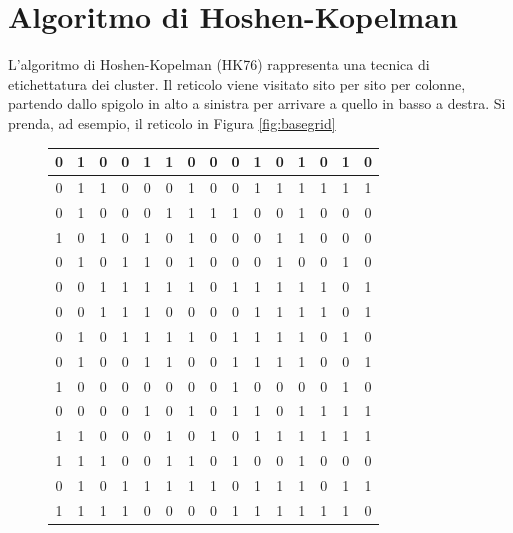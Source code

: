 \section{Algoritmo di Hoshen-Kopelman}
L’algoritmo di Hoshen-Kopelman (HK76) rappresenta una tecnica di etichettatura dei cluster. Il reticolo viene visitato sito per sito per colonne, partendo dallo spigolo in alto a sinistra per arrivare a quello in basso a destra. Si prenda, ad esempio, il reticolo in Figura \ref{fig:basegrid}
\begin{figure}[H]
	\centering
	\scriptsize %
	\setlength{\tabcolsep}{5.4pt} %
	\renewcommand{\arraystretch}{1.2} %
	\begin{minipage}{0.4\textwidth}
		\centering
		\begin{tabular}{|*{15}{c|}}
			\hline
			0 & 1 & 0 & 0 & 1 & 1 & 0 & 0 & 0 & 1 & 0 & 1 & 0 & 1 & 0 \\
			\hline
			0 & 1 & 1 & 0 & 0 & 0 & 1 & 0 & 0 & 1 & 1 & 1 & 1 & 1 & 1 \\
			\hline
			0 & 1 & 0 & 0 & 0 & 1 & 1 & 1 & 1 & 0 & 0 & 1 & 0 & 0 & 0 \\
			\hline
			1 & 0 & 1 & 0 & 1 & 0 & 1 & 0 & 0 & 0 & 1 & 1 & 0 & 0 & 0 \\
			\hline
			0 & 1 & 0 & 1 & 1 & 0 & 1 & 0 & 0 & 0 & 1 & 0 & 0 & 1 & 0 \\
			\hline
			0 & 0 & 1 & 1 & 1 & 1 & 1 & 0 & 1 & 1 & 1 & 1 & 1 & 0 & 1 \\
			\hline
			0 & 0 & 1 & 1 & 1 & 0 & 0 & 0 & 0 & 1 & 1 & 1 & 1 & 0 & 1 \\
			\hline
			0 & 1 & 0 & 1 & 1 & 1 & 1 & 0 & 1 & 1 & 1 & 1 & 0 & 1 & 0 \\
			\hline
			0 & 1 & 0 & 0 & 1 & 1 & 0 & 0 & 1 & 1 & 1 & 1 & 0 & 0 & 1 \\
			\hline
			1 & 0 & 0 & 0 & 0 & 0 & 0 & 0 & 1 & 0 & 0 & 0 & 0 & 1 & 0 \\
			\hline
			0 & 0 & 0 & 0 & 1 & 0 & 1 & 0 & 1 & 1 & 0 & 1 & 1 & 1 & 1 \\
			\hline
			1 & 1 & 0 & 0 & 0 & 1 & 0 & 1 & 0 & 1 & 1 & 1 & 1 & 1 & 1 \\
			\hline
			1 & 1 & 1 & 0 & 0 & 1 & 1 & 0 & 1 & 0 & 0 & 1 & 0 & 0 & 0 \\
			\hline
			0 & 1 & 0 & 1 & 1 & 1 & 1 & 1 & 0 & 1 & 1 & 1 & 0 & 1 & 1 \\
			\hline
			1 & 1 & 1 & 1 & 0 & 0 & 0 & 0 & 1 & 1 & 1 & 1 & 1 & 1 & 0 \\

\end{tabular}
\end{minipage}
\end{figure}
